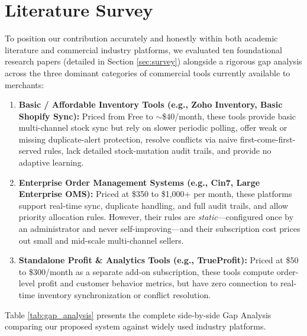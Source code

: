 \documentclass[oneside,a4paper,12pt]{report}
\begin{document}
\section{Literature Survey}
To position our contribution accurately and honestly within both academic literature and commercial industry platforms, we evaluated ten foundational research papers (detailed in Section \ref{sec:survey}) alongside a rigorous gap analysis across the three dominant categories of commercial tools currently available to merchants:
\begin{enumerate}
  \item \textbf{Basic / Affordable Inventory Tools (e.g., Zoho Inventory, Basic Shopify Sync):} Priced from Free to $\sim$\$40/month, these tools provide basic multi-channel stock sync but rely on slower periodic polling, offer weak or missing duplicate-alert protection, resolve conflicts via naive first-come-first-served rules, lack detailed stock-mutation audit trails, and provide no adaptive learning.
  \item \textbf{Enterprise Order Management Systems (e.g., Cin7, Large Enterprise OMS):} Priced at \$350 to \$1,000+ per month, these platforms support real-time sync, duplicate handling, and full audit trails, and allow priority allocation rules. However, their rules are \textit{static}—configured once by an administrator and never self-improving—and their subscription cost prices out small and mid-scale multi-channel sellers.
  \item \textbf{Standalone Profit \& Analytics Tools (e.g., TrueProfit):} Priced at \$50 to \$300/month as a separate add-on subscription, these tools compute order-level profit and customer behavior metrics, but have zero connection to real-time inventory synchronization or conflict resolution.
\end{enumerate}

Table \ref{tab:gap_analysis} presents the complete side-by-side Gap Analysis comparing our proposed system against widely used industry platforms.
\end{document}
